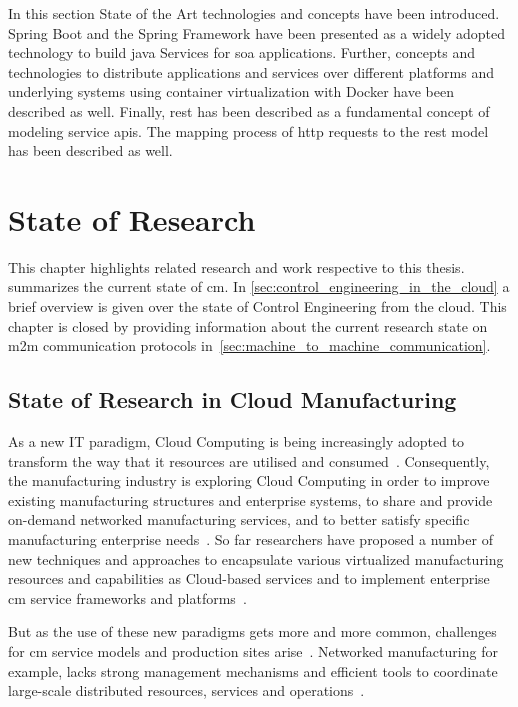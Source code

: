 \documentclass[
a4paper,
twoside,
headsepline,
cleardoublepage=empty,
parskip=half,
draft=false
]{scrbook}
\begin{document}
			In this section State of the Art technologies and concepts have been introduced.
			Spring Boot and the Spring Framework have been presented as a widely adopted technology to build \gls{java} Services for \gls{soa} applications.
			Further, concepts and technologies to distribute applications and services over different platforms and underlying systems using container virtualization with Docker have been described as well.
			Finally, \gls{rest} has been described as a fundamental concept of modeling service \gls{api}s. 
			The mapping process of \gls{http} requests to the \gls{rest} model has been described as well.

	\chapter{State of Research} \label{ch:state_of_the_Science}

		This chapter highlights related research and work respective to this thesis.  summarizes the current state of \gls{cm}. In \cref{sec:control_engineering_in_the_cloud} a brief overview is given over the state of Control Engineering from the cloud. This chapter is closed by providing information about the current research state on \gls{m2m} communication protocols in~\cref{sec:machine_to_machine_communication}.

		\section{State of Research in Cloud Manufacturing}\label{sec:state_of_science_cloud_manufacturing}

			As a new IT paradigm, Cloud Computing is being increasingly adopted to transform the way that \gls{it} resources are utilised and consumed~\cite{li2010cloud}. 
			Consequently, the manufacturing industry is exploring Cloud Computing in order to improve existing manufacturing structures and enterprise systems, to
			share and provide on-demand networked manufacturing services, and to better satisfy specific manufacturing enterprise needs~\cite{he2015state}.
			So far researchers have proposed a number of new techniques and approaches to encapsulate various virtualized manufacturing resources and capabilities as Cloud-based services and to implement enterprise \gls{cm} service frameworks and platforms~\cite{tao2011cloud}.
			
			But as the use of these new paradigms gets more and more common, challenges for \gls{cm} service models and production sites arise~\cite{brettel2014virtualization}.
			Networked manufacturing for example, lacks strong management mechanisms and efficient tools to coordinate large-scale distributed resources, services and operations~\cite{xu2012cloud}.
			
\end{document}
